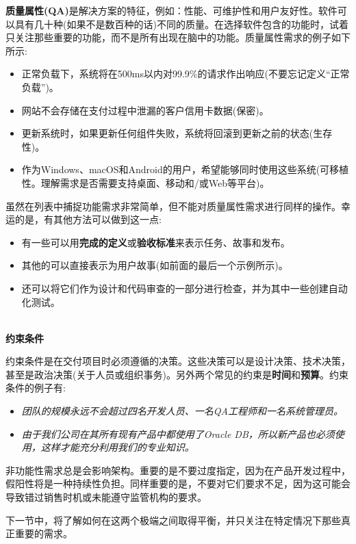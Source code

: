 \textbf{质量属性(QA)}是解决方案的特征，例如：性能、可维护性和用户友好性。软件可以具有几十种(如果不是数百种的话)不同的质量。在选择软件包含的功能时，试着只关注那些重要的功能，而不是所有出现在脑中的功能。质量属性需求的例子如下所示:

\begin{itemize}
\item 
正常负载下，系统将在500ms以内对99.9\%的请求作出响应(不要忘记定义“正常负载”)。

\item 
网站不会存储在支付过程中泄漏的客户信用卡数据(保密)。

\item
更新系统时，如果更新任何组件失败，系统将回滚到更新之前的状态(生存性)。

\item 
作为Windows、macOS和Android的用户，希望能够同时使用这些系统(可移植性。理解需求是否需要支持桌面、移动和/或Web等平台)。
\end{itemize}

虽然在列表中捕捉功能需求非常简单，但不能对质量属性需求进行同样的操作。幸运的是，有其他方法可以做到这一点:

\begin{itemize}
\item 
有一些可以用\textbf{完成的定义}或\textbf{验收标准}来表示任务、故事和发布。

\item 
其他的可以直接表示为用户故事(如前面的最后一个示例所示)。

\item 
还可以将它们作为设计和代码审查的一部分进行检查，并为其中一些创建自动化测试。
\end{itemize}

\hspace*{\fill} \\ %
\noindent
\textbf{约束条件}

约束条件是在交付项目时必须遵循的决策。这些决策可以是设计决策、技术决策，甚至是政治决策(关于人员或组织事务)。另外两个常见的约束是\textbf{时间}和\textbf{预算}。约束条件的例子有:

\begin{itemize}
\item 
\textit{团队的规模永远不会超过四名开发人员、一名QA工程师和一名系统管理员。}

\item 
\textit{由于我们公司在其所有现有产品中都使用了Oracle DB，所以新产品也必须使用，这样才能充分利用我们的专业知识。}
\end{itemize}

非功能性需求总是会影响架构。重要的是不要过度指定，因为在产品开发过程中，假阳性将是一种持续性负担。同样重要的是，不要对它们要求不足，因为这可能会导致错过销售时机或未能遵守监管机构的要求。

下一节中，将了解如何在这两个极端之间取得平衡，并只关注在特定情况下那些真正重要的需求。





